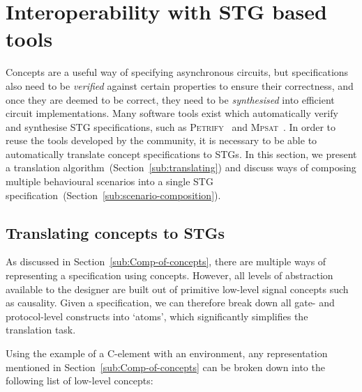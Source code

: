 \documentclass[british, journal]{IEEEtran}
\newcommand{\noun}[1]{\textsc{#1}}
\begin{document}
\vspace{-1mm}
\section{Interoperability with STG based tools\label{sec:interop-with-stg}}

Concepts are a useful way of specifying asynchronous circuits, but
specifications also need to be \emph{verified} against certain properties to ensure
their correctness, and once they are deemed to be correct, they need to
be \emph{synthesised} into efficient circuit implementations. Many software
tools exist which automatically verify and synthesise STG specifications,
such as \noun{Petrify}~\cite{Cortadella} and \noun{Mpsat}~\cite{khomenko2004detecting}.
In order to reuse the tools developed by the community, it is
necessary to be able to automatically translate concept specifications to STGs.
In this section, we present a translation algorithm~(Section~\ref{sub:translating})
and discuss ways of composing multiple behavioural scenarios into a single STG specification~(Section~\ref{sub:scenario-composition}).

\vspace{-2mm}
\subsection{Translating concepts to STGs\label{sub:translating}}

As discussed in Section~\ref{sub:Comp-of-concepts}, there are multiple ways of
representing a specification using concepts. However, all levels of
abstraction available to the designer are built out of primitive low-level
signal concepts such as causality. Given a specification, we can therefore
break down all gate- and protocol-level constructs into `atoms', which
significantly simplifies the translation task.

Using the example of a C-element with an environment, any representation
mentioned in Section~\ref{sub:Comp-of-concepts} can be broken down into the
following list of low-level concepts:
\end{document}
